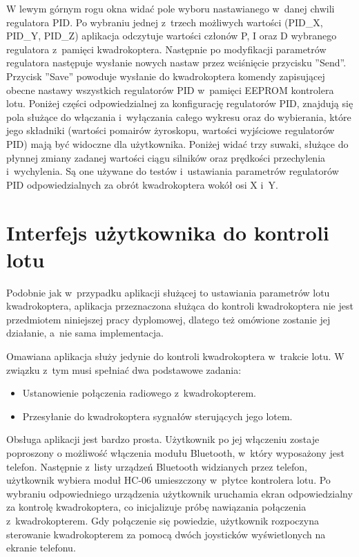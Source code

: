 W lewym górnym rogu okna widać pole wyboru nastawianego w~danej chwili regulatora PID. Po wybraniu jednej z~trzech możliwych wartości (PID\_X, PID\_Y, PID\_Z) aplikacja odczytuje wartości członów P, I oraz D wybranego regulatora z~pamięci kwadrokoptera. Następnie po modyfikacji parametrów regulatora następuje wysłanie nowych nastaw przez wciśnięcie przycisku ''Send''. Przycisk ''Save'' powoduje wysłanie do kwadrokoptera komendy zapisującej obecne nastawy wszystkich regulatorów PID w~pamięci EEPROM kontrolera lotu. Poniżej części odpowiedzialnej za konfigurację regulatorów PID, znajdują się pola służące do włączania i~wyłączania całego wykresu oraz do wybierania, które jego składniki (wartości pomairów żyroskopu, wartości wyjściowe regulatorów PID) mają być widoczne dla użytkownika. Poniżej widać trzy suwaki, służące do płynnej zmiany zadanej wartości ciągu silników oraz prędkości przechylenia i~wychylenia. Są one używane do testów i~ustawiania parametrów regulatorów PID odpowiedzialnych za obrót kwadrokoptera wokół osi X i~Y. 


\section{Interfejs użytkownika do kontroli lotu}

Podobnie jak w~przypadku aplikacji służącej to ustawiania parametrów lotu kwadrokoptera, aplikacja przeznaczona służąca do kontroli kwadrokoptera nie jest przedmiotem niniejszej pracy dyplomowej, dlatego też omówione zostanie jej działanie, a~nie sama implementacja.

Omawiana aplikacja służy jedynie do kontroli kwadrokoptera w~trakcie lotu. W związku z~tym musi spełniać dwa podstawowe zadania:
\begin{itemize}
	\item Ustanowienie połączenia radiowego z~kwadrokopterem.
	\item Przesyłanie do kwadrokoptera sygnałów sterujących jego lotem.
\end{itemize}

Obsługa aplikacji jest bardzo prosta. Użytkownik po jej włączeniu zostaje poproszony o możliwość włączenia modułu Bluetooth, w~który wyposażony jest telefon. Następnie z~listy urządzeń Bluetooth widzianych przez telefon, użytkownik wybiera moduł HC-06 umieszczony w~płytce kontrolera lotu. Po wybraniu odpowiedniego urządzenia użytkownik uruchamia ekran odpowiedzialny za kontrolę kwadrokoptera, co inicjalizuje próbę nawiązania połączenia z~kwadrokopterem. Gdy połączenie się powiedzie, użytkownik rozpoczyna sterowanie kwadrokopterem za pomocą dwóch joysticków wyświetlonych na ekranie telefonu.

